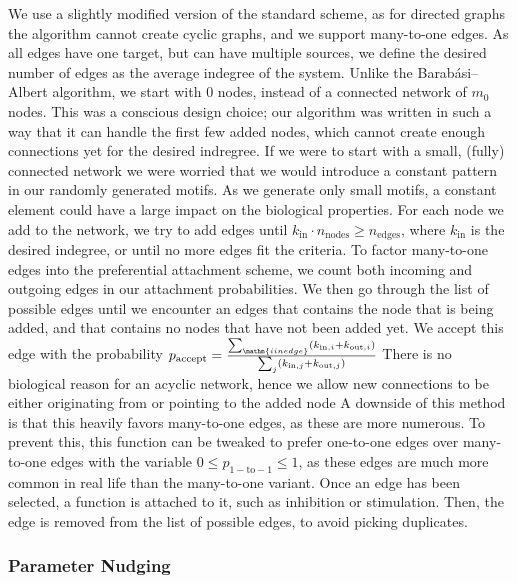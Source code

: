 \documentclass[../main.tex]{subfiles}
\begin{document}
We use a slightly modified version of the standard scheme, as for directed graphs the algorithm cannot create cyclic graphs, and we support many-to-one edges.
As all edges have one target, but can have multiple sources, we define the desired number of edges as the average indegree of the system.
Unlike the Barabási–Albert algorithm, we start with 0 nodes, instead of a connected network of $m_0$ nodes. 
This was a conscious design choice; our algorithm was written in such a way that it can handle the first few added nodes, which cannot create enough connections yet for the desired indregree.
If we were to start with a small, (fully) connected network we were worried that we would introduce a constant pattern in our randomly generated motifs.
As we generate only small motifs, a constant element could have a large impact on the biological properties. %
For each node we add to the network, we try to add edges until $k_\mathrm{in} \cdot n_\mathrm{nodes} \ge n_\mathrm{edges}$, where $k_\mathrm{in}$ is the desired indegree, or until no more edges fit the criteria.
To factor many-to-one edges into the preferential attachment scheme, we count both incoming and outgoing edges in our attachment probabilities.
We then go through the list of possible edges until we encounter an edges that contains the node that is being added, and that contains no nodes that have not been added yet.
We accept this edge with the probability $p_\mathrm{accept} = \frac{\sum_{\mathm{i in edge}} (k_{\mathrm{in},i} + k_{\mathrm{out},i})}{\sum_j (k_{\mathrm{in},j} + k_{\mathrm{out},j})}$
There is no biological reason for an acyclic network, hence we allow new connections to be either originating from or pointing to the added node
A downside of this method is that this heavily favors many-to-one edges, as these are more numerous.
To prevent this, this function can be tweaked to prefer one-to-one edges over many-to-one edges with the variable $0 \le p_\mathrm{1-to-1} \le 1$, as these edges are much more common in real life than the many-to-one variant.
Once an edge has been selected, a function is attached to it, such as inhibition or stimulation.
Then, the edge is removed from the list of possible edges, to avoid picking duplicates.

\subsubsection{Parameter Nudging}
\end{document}
